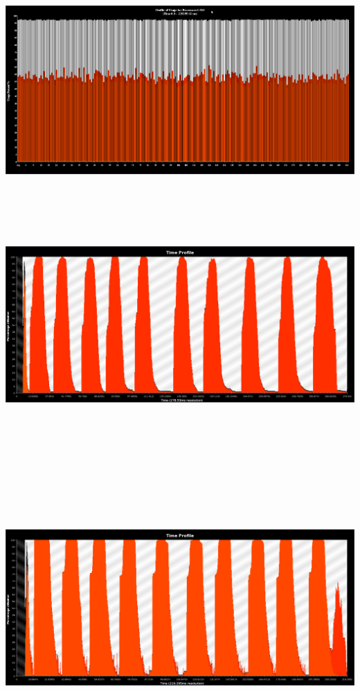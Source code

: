 \documentclass{book}
\begin{document}
\includegraphics[width=6.5in]{usage-cr.png}
\ \\
\includegraphics[width=6.8in, height=4in]{time-profile-rc.png} \\ \ \\
\includegraphics[width=5.325in, height=4in]{time-profile-cr.png}
\end{document}
